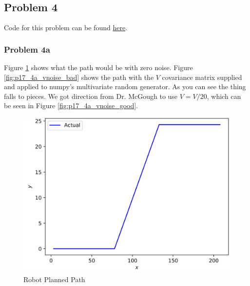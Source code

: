 \documentclass{article}
\begin{document}
\newpage
\subsection{Problem 4}
Code for this problem can be found 
\href{https://github.com/macattackftw/RoboticsHW/blob/master/HW5/problem17_4.py}{here}.
\subsubsection{Problem 4a}
Figure \ref{fig:p17_4a_planned} shows what the path would be with zero noise. 
Figure \ref{fig:p17_4a_vnoise_bad} shows the path with the $V$ covariance 
matrix supplied and applied to numpy's multivariate random generator. As you can 
see the thing falls to pieces. We got direction from Dr. McGough to use 
$V = V / 20$, which can be seen in Figure \ref{fig:p17_4a_vnoise_good}.

\begin{figure}[h]
    \centering
    \includegraphics[scale=0.75]{problem17_4a_pure}
    \caption{Robot Planned Path}
    \label{fig:p17_4a_planned}
\end{figure}
\end{document}
